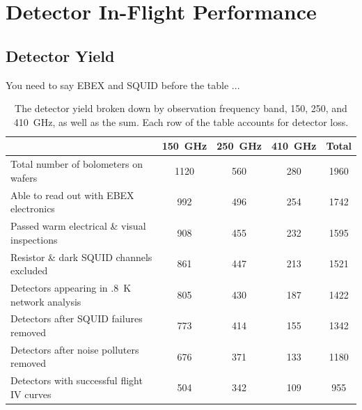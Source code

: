 \chapter{Detector In-Flight Performance}
\label{operation_chapter}

\section{Detector Yield}
\label{sec:yield}

You need to say \ac{EBEX} and \ac{SQUID} before the table ...

\begin{table}[ht!]
\begin{center}
\begin{tabular}{l|c|c|c|c}
  & 150~GHz & 250~GHz & 410~GHz & Total \\
\hline Total number of bolometers on wafers & 1120 & 560 & 280 & 1960 \\
\hline Able to read out with \ac{EBEX} electronics & 992 & 496 & 254 & 1742 \\
\hline Passed warm electrical \& visual inspections & 908 & 455 & 232 & 1595 \\
\hline Resistor \& dark \ac{SQUID} channels excluded & 861 & 447 & 213 & 1521 \\
\hline Detectors appearing in .8~K network analysis & 805 & 430 & 187 & 1422 \\
\hline Detectors after SQUID failures removed & 773 & 414 & 155 & 1342 \\
\hline Detectors after noise polluters removed & 676 & 371 & 133 & 1180 \\
\hline Detectors with successful flight IV curves & 504 & 342 & 109 & 955 \\
\hline
\end{tabular}
\end{center}
\caption{The detector yield broken down by observation frequency band, 150, 250, and 410~GHz, as well as the sum. Each row of the table accounts for detector loss.}
\label{yield_table}
\end{table}

